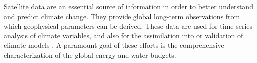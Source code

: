 
\introduction


Satellite data are an essential source of information in order to
better understand and predict climate change. They provide global long-term
observations from which geophysical parameters can be derived. These data are used for
time-series analysis of climate variables, and also for the assimilation into
or validation of climate models \citep{Comiso14,Yang13}. A paramount goal of
these efforts is the comprehensive characterization of the global energy and
water budgets.

